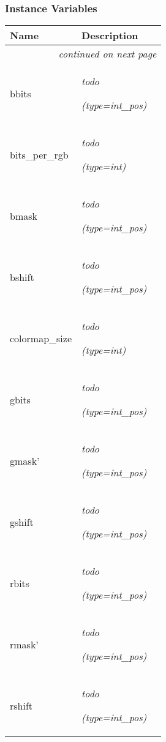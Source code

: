 
  \subsubsection{Instance Variables}

    \vspace{-1cm}
\hspace{\varindent}\begin{longtable}{|p{\varnamewidth}|p{\vardescrwidth}|l}
\cline{1-2}
\cline{1-2} \centering \textbf{Name} & \centering \textbf{Description}& \\
\cline{1-2}
\endhead\cline{1-2}\multicolumn{3}{r}{\small\textit{continued on next page}}\\\endfoot\cline{1-2}
\endlastfoot\raggedright b\-b\-i\-t\-s\- & \raggedright \emph{todo}

            {\it (type=int\_pos)}&\\
\cline{1-2}
\raggedright b\-i\-t\-s\-\_\-p\-e\-r\-\_\-r\-g\-b\- & \raggedright \emph{todo}

            {\it (type=int)}&\\
\cline{1-2}
\raggedright b\-m\-a\-s\-k\- & \raggedright \emph{todo}

            {\it (type=int\_pos)}&\\
\cline{1-2}
\raggedright b\-s\-h\-i\-f\-t\- & \raggedright \emph{todo}

            {\it (type=int\_pos)}&\\
\cline{1-2}
\raggedright c\-o\-l\-o\-r\-m\-a\-p\-\_\-s\-i\-z\-e\- & \raggedright \emph{todo}

            {\it (type=int)}&\\
\cline{1-2}
\raggedright g\-b\-i\-t\-s\- & \raggedright \emph{todo}

            {\it (type=int\_pos)}&\\
\cline{1-2}
\raggedright g\-m\-a\-s\-k\-'\- & \raggedright \emph{todo}

            {\it (type=int\_pos)}&\\
\cline{1-2}
\raggedright g\-s\-h\-i\-f\-t\- & \raggedright \emph{todo}

            {\it (type=int\_pos)}&\\
\cline{1-2}
\raggedright r\-b\-i\-t\-s\- & \raggedright \emph{todo}

            {\it (type=int\_pos)}&\\
\cline{1-2}
\raggedright r\-m\-a\-s\-k\-'\- & \raggedright \emph{todo}

            {\it (type=int\_pos)}&\\
\cline{1-2}
\raggedright r\-s\-h\-i\-f\-t\- & \raggedright \emph{todo}

            {\it (type=int\_pos)}&\\
\cline{1-2}
\end{longtable}

